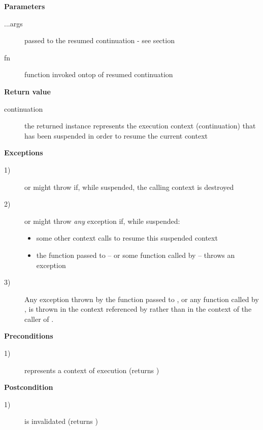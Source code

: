 {\bfseries Parameters}
\begin{description}
    \item[...args] passed to the resumed continuation - see section
    \item[fn] function invoked ontop of resumed continuation\\
\end{description}

{\bfseries Return value}
\begin{description}
    \item[continuation] the returned instance represents the execution context
                        (continuation) that has been suspended in order to
                        resume the current context
\end{description}

{\bfseries Exceptions}
\begin{description}
    \item[1)] \resume or \resumewith might
              throw \unwindex if, while suspended, the
              calling context is destroyed
    \item[2)] \resume or \resumewith might throw \emph{any}
              exception if, while suspended:
        \begin{itemize}
            \item some other context calls \resumewith to resume
              this suspended context
            \item the function  passed to \resumewith --
              or some function called by  -- throws an exception
        \end{itemize}
    \item[3)] Any exception thrown by the function  passed
              to \resumewith, or any function called by , is thrown in
              the context referenced by  rather than in the context
              of the caller of \resumewith.
\end{description}

{\bfseries Preconditions}
\begin{description}
    \item[1)]  represents a context of execution (\opbool returns
               )
\end{description}

{\bfseries Postcondition}
\begin{description}
    \item[1)]  is invalidated (\opbool returns )
\end{description}

